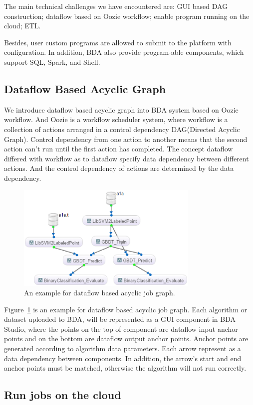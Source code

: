\documentclass{sig-alternate-05-2015}
\begin{document}
The main technical challenges we have encountered are: GUI based DAG construction; dataflow based on Oozie workflow; enable program running on the cloud; ETL.

Besides, user custom programs are allowed to submit to the platform with configuration. In addition, BDA also provide program-able components, which support SQL, Spark, and Shell. 


\subsection{Dataflow Based Acyclic Graph}
We introduce dataflow based acyclic graph into BDA system based on Oozie workflow. And Oozie is a workflow scheduler system, where workflow is a collection of actions arranged in a control dependency DAG(Directed Acyclic Graph). Control dependency from one action to another means that the second action can't run until the first action has completed. The concept dataflow differed with workflow as to dataflow specify data dependency between different actions. And the control dependency of actions are determined by the data dependency.


\begin{figure}
\centering
\includegraphics[height=2in]{DAG.eps}
\caption{ An example for dataflow based acyclic job graph.}
\label{fig:dag}
\end{figure}

Figure~\ref{fig:dag} is an example for dataflow based acyclic job graph. Each algorithm or dataset uploaded to BDA, will be represented as a GUI component in BDA Studio, where the points on the top of component are dataflow input anchor points and on the bottom are dataflow output anchor points. Anchor points are generated according to algorithm data parameters. Each arrow represent as a data dependency between components. In addition, the arrow's start and end anchor points must be matched, otherwise the algorithm will not run correctly.

\subsection{Run jobs on the cloud}
\end{document}
